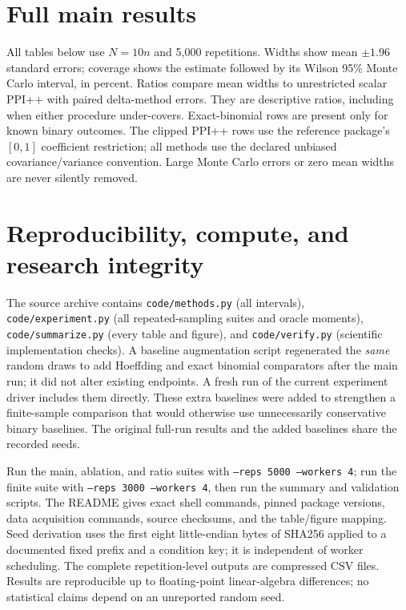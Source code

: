 \documentclass{article}
\begin{document}
\clearpage
\section{Full main results}
\label{app:full}
All tables below use $N=10n$ and 5,000 repetitions. Widths show mean $\pm1.96$ standard errors; coverage shows the estimate followed by its Wilson 95\% Monte Carlo interval, in percent. Ratios compare mean widths to unrestricted scalar PPI++ with paired delta-method errors. They are descriptive ratios, including when either procedure under-covers. Exact-binomial rows are present only for known binary outcomes. The clipped PPI++ rows use the reference package's $[0,1]$ coefficient restriction; all methods use the declared unbiased covariance/variance convention. Large Monte Carlo errors or zero mean widths are never silently removed.


\clearpage
\section{Reproducibility, compute, and research integrity}
\label{app:reproduce}
The source archive contains \texttt{code/methods.py} (all intervals), \texttt{code/experiment.py} (all repeated-sampling suites and oracle moments), \texttt{code/summarize.py} (every table and figure), and \texttt{code/verify.py} (scientific implementation checks). A baseline augmentation script regenerated the \emph{same} random draws to add Hoeffding and exact binomial comparators after the main run; it did not alter existing endpoints. A fresh run of the current experiment driver includes them directly. These extra baselines were added to strengthen a finite-sample comparison that would otherwise use unnecessarily conservative binary baselines. The original full-run results and the added baselines share the recorded seeds.

Run the main, ablation, and ratio suites with \texttt{--reps 5000 --workers 4}; run the finite suite with \texttt{--reps 3000 --workers 4}, then run the summary and validation scripts. The README gives exact shell commands, pinned package versions, data acquisition commands, source checksums, and the table/figure mapping. Seed derivation uses the first eight little-endian bytes of SHA256 applied to a documented fixed prefix and a condition key; it is independent of worker scheduling. The complete repetition-level outputs are compressed CSV files. Results are reproducible up to floating-point linear-algebra differences; no statistical claims depend on an unreported random seed.
\end{document}
